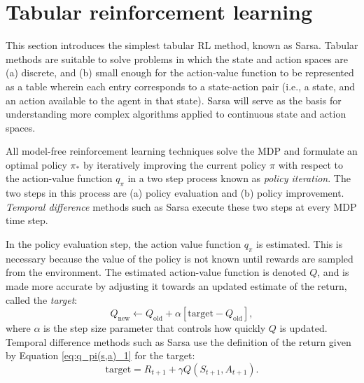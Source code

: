 \section{Tabular reinforcement learning}
This section introduces the simplest tabular RL method, known as Sarsa.
Tabular methods are suitable to solve problems in which the state and action spaces are (a) discrete, and (b) small enough for the action-value function to be represented as a table wherein each entry corresponds to a state-action pair (i.e., a state, and an action available to the agent in that state).
Sarsa will serve as the basis for understanding more complex algorithms applied to continuous state and action spaces.

All model-free reinforcement learning techniques solve the MDP and formulate an optimal policy $\pi_*$ by iteratively improving the current policy $\pi$ with respect to the action-value function $q_\pi$ in a two step process known as \emph{policy iteration}.
The two steps in this process are (a) policy evaluation and (b) policy improvement.
\emph{Temporal difference} methods such as Sarsa execute these two steps at every MDP time step.

In the policy evaluation step, the action value function $q_\pi$ is estimated.
This is necessary because the value of the policy is not known until rewards are sampled from the environment.
The estimated action-value function is denoted $Q$, and is made more accurate by adjusting it towards an updated estimate of the return, called the \emph{target}:
\begin{equation}\label{eq:tab_policy_eval}
    Q_{\text{new}} \leftarrow  Q_{\text{old}} + \alpha [\text{target} - Q_{\text{old}}],
\end{equation}
where $\alpha$ is the step size parameter that controls how quickly $Q$ is updated.
Temporal difference methods such as Sarsa use the definition of the return given by Equation \ref{eq:q_pi(s,a)_1} for the target:
\begin{equation}\label{eq:sarsa_target}
    \text{target} = R_{t+1} + \gamma Q(S_{t+1}, A_{t+1}).
\end{equation}

